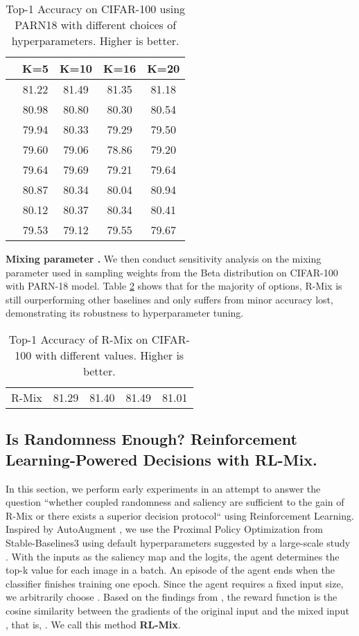 \documentclass[letterpaper]{article} \usepackage[submission]{aaai23}  \usepackage{times}  \usepackage{helvet}  \usepackage{courier}  \usepackage[hyphens]{url}  \usepackage{graphicx} \urlstyle{rm} \def\UrlFont{\rm}  \usepackage{natbib}  \usepackage{caption} \frenchspacing  \setlength{\pdfpagewidth}{8.5in} \setlength{\pdfpageheight}{11in}
\newcommand{\rrlmix}{{R-Mix}}
\newcommand{\cifar}{CIFAR-100}
\begin{document}
\begin{table}[h!]
\centering
\begin{tabular}{l|cccc}
 & K=5 & K=10 & K=16 & K=20 \\ \hline
 & 81.22 & 81.49 & 81.35 & 81.18 \\
 & 80.98 & 80.80 & 80.30 & 80.54 \\
 & 79.94 & 80.33 & 79.29 & 79.50 \\
 & 79.60 & 79.06 & 78.86 & 79.20 \\
 & 79.64 & 79.69 & 79.21 & 79.64 \\
 & 80.87 & 80.34 & 80.04 & 80.94 \\
 & 80.12 & 80.37 & 80.34 & 80.41 \\
 & 79.53 & 79.12 & 79.55 & 79.67
\end{tabular}
\caption{Top-1 Accuracy on \cifar{} using PARN18 with different choices of hyperparameters. Higher is better.}
\label{tab:hyperparam}
\end{table}

\textbf{Mixing parameter .} We then conduct sensitivity analysis on the mixing parameter  used in sampling weights from the Beta distribution on CIFAR-100 with PARN-18 model. Table \ref{table:alpha} shows that for the majority of options, \rrlmix{} is still ourperforming other baselines and only suffers from minor accuracy lost, demonstrating its robustness to hyperparameter tuning.

\begin{table}[h!]
\centering
\begin{tabular}{lcccc}
\hline
 &  &  &  &  \\ \hline
R-Mix & 81.29 & 81.40 & 81.49 & 81.01 \\ \hline
\end{tabular}
\caption{Top-1 Accuracy of R-Mix on CIFAR-100 with different  values. Higher is better.}
\label{table:alpha}
\end{table}


\subsection{Is Randomness Enough? Reinforcement Learning-Powered Decisions with RL-Mix.}

In this section, we perform early experiments in an attempt to answer the question ``whether coupled randomness and saliency are sufficient to the gain of R-Mix or there exists a superior decision protocol`` using Reinforcement Learning. Inspired by AutoAugment \cite{Cubuk2019AutoAug}, we use the Proximal Policy Optimization \cite{schulman2017ppo} from Stable-Baselines3 \cite{stable-baselines3} using default hyperparameters suggested by a large-scale study \cite{andrychowicz2021whatmatter}. With the inputs as the saliency map  and the logits, the agent determines the top-k value for each image in a batch. An episode of the agent ends when the classifier  finishes training one epoch. Since the agent requires a fixed input size, we arbitrarily choose . Based on the findings from \cite{zheng2022deep}, the reward function is the cosine similarity between the gradients of the original input  and the mixed input , that is, . We call this method \textbf{RL-Mix}.
\end{document}
